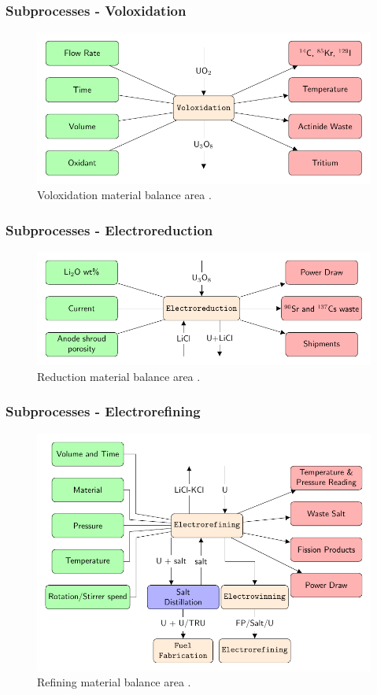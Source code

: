 \begin{frame}
\frametitle{Subprocesses - Voloxidation}
		\begin{figure} 
			\centering
			\includegraphics[width=0.9\linewidth]{volox}
			\caption{Voloxidation material balance area \cite{jubin_spent_2009}.}
			\label{fig:volox}
		\end{figure}
\end{frame}
\begin{frame}
\frametitle{Subprocesses - Electroreduction}
		\begin{figure} 
			\centering
			\includegraphics[width=0.9\linewidth]{reduction}
			\caption{Reduction material balance area \cite{lee_advanced_2008}.}
			\label{fig:reduction}
		\end{figure}
\end{frame}
\begin{frame}
\frametitle{Subprocesses - Electrorefining}
		\begin{figure}
			\centering
			\includegraphics[width=0.85\linewidth]{refining}
			\caption{Refining material balance area \cite{lee_advanced_2008}.}
			\label{fig:refining}
		\end{figure}
\end{frame}
